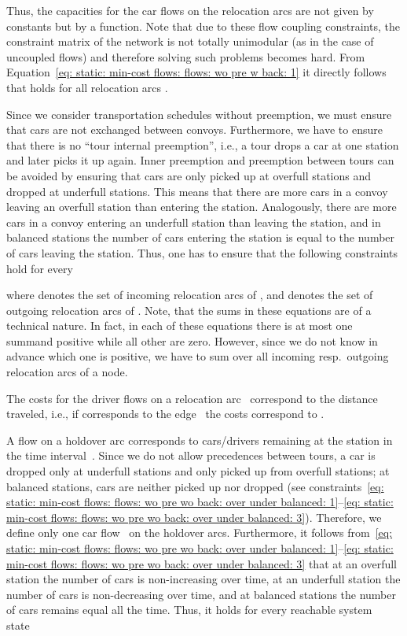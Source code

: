 \documentclass[english]{llncs}
\numberwithin{sublemma}{lemma}
\begin{document}
Thus, the capacities for the car flows  on the relocation arcs are not given by constants but by a function.
Note that due to these flow coupling constraints, the constraint matrix 
of the network is not totally unimodular (as in the case of uncoupled flows) and therefore solving such problems becomes hard.
From Equation~\eqref{eq: static: min-cost flows: flows: wo pre w back: 1} it directly follows that  holds for all relocation arcs .

Since we consider transportation schedules without preemption, we must ensure that cars are not exchanged between convoys.
Furthermore, we have to ensure that there is no ``tour internal preemption'', i.e., a tour drops a car at one station and later picks it up again.
Inner preemption and preemption between tours can be avoided by ensuring that cars are only picked up at overfull stations and dropped at underfull stations.
This means that there are more cars in a convoy leaving an overfull station than entering the station.
Analogously, there are more cars in a convoy entering an underfull station than leaving the station, and in balanced stations the number of cars entering the station is equal to the number of cars leaving the station.
Thus, one has to ensure that the following constraints hold for every 

where  denotes the set of incoming relocation arcs of , and  denotes the set of outgoing relocation arcs of .
Note, that the sums in these equations are of a technical nature.
In fact, in each of these equations there is at most one summand positive while all other are zero.
However, since we do not know in advance which one is positive, we have to sum over all incoming resp.~outgoing relocation arcs of a node.


The costs for the driver flows on a relocation arc~ correspond to the distance traveled, i.e., if  corresponds to the edge~ the costs correspond to .


A flow on a holdover arc corresponds to cars/drivers remaining at the station in the time interval~.
Since we do not allow precedences between tours, a car is dropped only at underfull stations and only picked up from overfull stations;
at balanced stations, cars are neither picked up nor dropped (see constraints~\eqref{eq: static: min-cost flows: flows: wo pre wo back: over under balanced: 1}--\eqref{eq: static: min-cost flows: flows: wo pre wo back: over under balanced: 3}).
Therefore, we define only one car flow~ on the holdover arcs.
Furthermore, it follows from~\eqref{eq: static: min-cost flows: flows: wo pre wo back: over under balanced: 1}--\eqref{eq: static: min-cost flows: flows: wo pre wo back: over under balanced: 3}
that at an overfull station the number of cars is non-increasing over time, at an underfull station the number of cars is non-decreasing over time, and at balanced stations the number of cars remains equal all the time.
Thus, it holds for every reachable system state~
\end{document}
